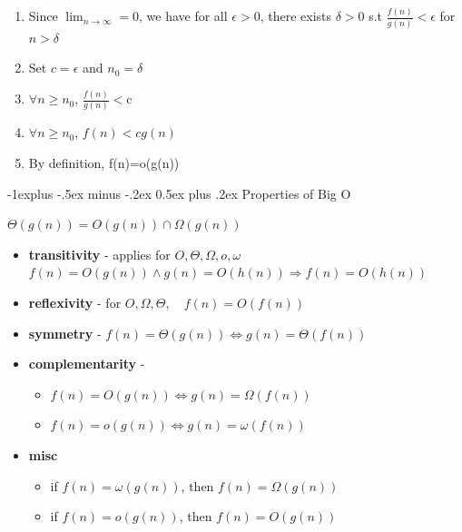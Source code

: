 \documentclass[10pt, landscape]{article}
\makeatletter
\renewcommand{\subsection}{\@startsection{subsection}{2}{0mm}%
  {-1explus -.5ex minus -.2ex}%
  {0.5ex plus .2ex}%
{\normalfont\normalsize\bfseries}}
\makeatother
\begin{document}
\begin{multicols*}{4}
  \begin{niceproof}
    \begin{enumerate}
      \item Since $\lim_{n \to \infty} = 0$, we have for all $\epsilon>0$, there exists $\delta>0$ s.t $\frac{f(n)}{g(n)}<\epsilon$ for $n>\delta$
      \item Set $c=\epsilon$ and $n_0=\delta$
      \item $\forall n \geq n_0$, $\frac{f(n)}{g(n)}<$c 
      \item $\forall n \geq n_0$, $f(n) < cg(n)$ 
     \item By definition, f(n)=o(g(n))
    \end{enumerate}
  \end{niceproof}

  \subsection{Properties of Big O}

  \begin{fixedbox}
    $\Theta(g(n)) = O(g(n)) \cap \Omega(g(n))$
  \end{fixedbox}

  \begin{itemize}
    \item \textbf{transitivity} - applies for $O, \Theta, \Omega, o, \omega$
      $f(n) = O(g(n)) \land g(n) = O(h(n)) \Rightarrow f(n) = O(h(n))$ 
    \item \textbf{reflexivity} - for $O, \Omega, \Theta, \quad f(n) = O(f(n))$ 
    \item \textbf{symmetry} - $f(n) = \Theta(g(n)) \iff g(n) = \Theta(f(n))$
    \item \textbf{complementarity} - 
      \begin{itemize}
        \item $f(n) = O(g(n)) \iff g(n) = \Omega(f(n))$
        \item $f(n) = o(g(n)) \iff g(n) = \omega(f(n))$
      \end{itemize}
    \item \textbf{misc}
      \begin{itemize}
        \item if $f(n) = \omega(g(n))$, then $f(n) = \Omega(g(n))$
        \item if $f(n) = o(g(n))$, then $f(n) = O(g(n))$
      \end{itemize}
  \end{itemize}


\end{multicols*}
\end{document}
